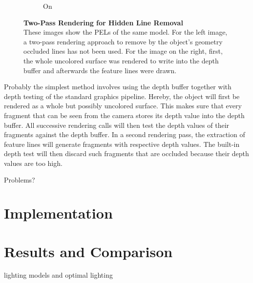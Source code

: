 \documentclass[9pt,fleqn,twoside,twocolumn]{stdglobal}
\begin{document}
\begin{figure}[h]
\begin{subfigure}[b]{0.49\linewidth}
        \caption{On}
      \end{subfigure}
      \caption{%
        \textbf{Two-Pass Rendering for Hidden Line Removal}\\
        These images show the PELs of the same model.
        For the left image, a two-pass rendering approach to remove by the object's geometry occluded lines has not been used.
        For the image on the right, first, the whole uncolored surface was rendered to write into the depth buffer and afterwards the feature lines were drawn.
      }
      \label{fig:hidden-line-removal}
    \end{figure}

    Probably the simplest method involves using the depth buffer together with depth testing of the standard graphics pipeline.
    Hereby, the object will first be rendered as a whole but possibly uncolored surface.
    This makes sure that every fragment that can be seen from the camera stores its depth value into the depth buffer.
    All successive rendering calls will then test the depth values of their fragments against the depth buffer.
    In a second rendering pass, the extraction of feature lines will generate fragments with respective depth values.
    The built-in depth test will then discard such fragments that are occluded because their depth values are too high.

    Problems?

\section{Implementation}

\section{Results and Comparison}

  lighting models and optimal lighting
\end{document}
